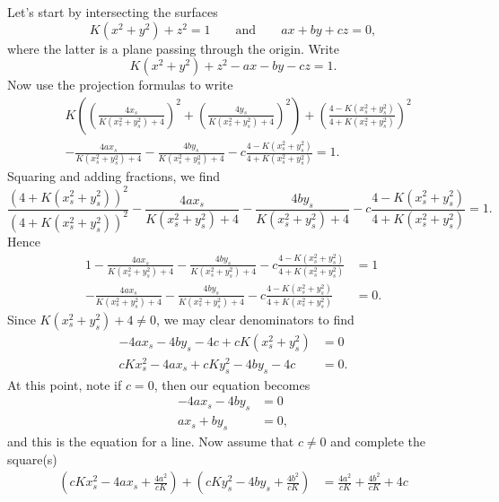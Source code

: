 \documentclass{ximera}
\begin{document}
\begin{problem}
\begin{freeResponse}
  Let's start by intersecting the surfaces
  \[
  K\left(x^2+y^2\right)+z^2=1\qquad\text{and}\qquad ax+by+cz=0,
  \]
  where the latter is a plane passing through the origin. Write
  \[
  K\left(x^2+y^2\right) + z^2- ax- by-cz=1.
  \]
  Now use the projection formulas to write
  \begin{align*}
    &K\left(\left(\frac{4x_s}{K\left(x_s^2 + y_s^2\right) + 4}\right)^2
    +\left(\frac{4y_s}{K\left(x_s^2 + y_s^2\right) + 4}\right)^2\right)
    + \left(\frac{4-K\left(x_s^2 + y_s^2\right)}{4+K\left(x_s^2 + y_s^2\right)}\right)^2\\
    &-\frac{4ax_s}{K\left(x_s^2 + y_s^2\right) + 4}- \frac{4by_s}{K\left(x_s^2 + y_s^2\right) + 4}-c\frac{4-K\left(x_s^2 + y_s^2\right)}{4+K\left(x_s^2 + y_s^2\right)}=1.
  \end{align*}
Squaring and adding fractions, we find
\[
\frac{\left(4+K\left(x_s^2 + y_s^2\right)\right)^2}{\left(4+K\left(x_s^2 + y_s^2\right)\right)^2}-\frac{4ax_s}{K\left(x_s^2 + y_s^2\right) + 4}- \frac{4by_s}{K\left(x_s^2 + y_s^2\right) + 4}-c\frac{4-K\left(x_s^2 + y_s^2\right)}{4+K\left(x_s^2 + y_s^2\right)}=1.
\]
Hence
\begin{align*}
1-\frac{4ax_s}{K\left(x_s^2 + y_s^2\right) + 4}- \frac{4by_s}{K\left(x_s^2 + y_s^2\right) + 4}-c\frac{4-K\left(x_s^2 + y_s^2\right)}{4+K\left(x_s^2 + y_s^2\right)}&=1\\
 -\frac{4ax_s}{K\left(x_s^2 + y_s^2\right) + 4}- \frac{4by_s}{K\left(x_s^2 + y_s^2\right) + 4}-c\frac{4-K\left(x_s^2 + y_s^2\right)}{4+K\left(x_s^2 + y_s^2\right)}&=0.
\end{align*}
Since $K\left(x_s^2 + y_s^2\right) + 4 \ne 0$, we may clear
denominators to find 
  \begin{align*}
    -4ax_s-4by_s-4c + cK\left(x_s^2+y_s^2\right) &= 0\\
    cKx_s^2-4ax_s + cKy_s^2-4by_s-4c &= 0.
  \end{align*}
  At this point, note if $c=0$, then our equation becomes
  \begin{align*}
    -4ax_s -4by_s &= 0\\
    ax_s + by_s &= 0,
  \end{align*}
  and this is the equation for a line. Now assume that $c\ne 0$ and
  complete the square(s)
  \begin{align*}
  \left(cKx_s^2 - 4ax_s + \frac{4a^2}{cK}\right) + \left(cKy_s^2 - 4by_s + \frac{4b^2}{cK}\right) &=
  \frac{4a^2}{cK} + \frac{4b^2}{cK} + 4c\\

\end{align*}
\end{freeResponse}
\end{problem}
\end{document}
